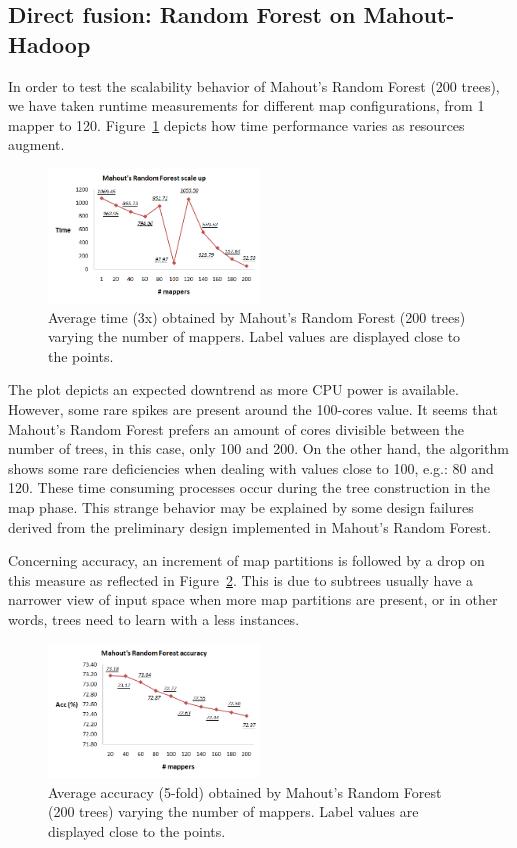 \documentclass[3p,review]{elsarticle}
\begin{document}
\subsection{Direct fusion: Random Forest on Mahout-Hadoop}
\label{subsec:rfmahout}

In order to test the scalability behavior of Mahout's Random Forest (200 trees), we have taken runtime measurements for different map configurations, from 1 mapper to 120. Figure~\ref{fig:rf-mahout} depicts how time performance varies as resources augment.

\begin{figure}[htp]
    \centering
    \includegraphics[width=0.5\textwidth]{rf-mahout}
    \caption{Average time (3x) obtained by Mahout's Random Forest (200 trees) varying the number of mappers. Label values are displayed close to the points.}
    \label{fig:rf-mahout}
\end{figure}

The plot depicts an expected downtrend as more CPU power is available. However, some rare spikes are present around the 100-cores value. It seems that Mahout's Random Forest prefers an amount of cores divisible between the number of trees, in this case, only 100 and 200. On the other hand, the algorithm shows some rare deficiencies when dealing with values close to 100, e.g.: 80 and 120. These time consuming processes occur during the tree construction in the map phase. This strange behavior may be explained by some design failures derived from the preliminary design implemented in Mahout's Random Forest.

Concerning accuracy, an increment of map partitions is followed by a drop on this measure as reflected in Figure~\ref{fig:rf-mahout-pred}. This is due to subtrees usually have a narrower view of input space when more map partitions are present, or in other words, trees need to learn with a less instances.

\begin{figure}[htp]
    \centering
    \includegraphics[width=0.5\textwidth]{rf-mahout-acc}
    \caption{Average accuracy (5-fold) obtained by Mahout's Random Forest (200 trees) varying the number of mappers. Label values are displayed close to the points.}
    \label{fig:rf-mahout-pred}
\end{figure}
\end{document}
